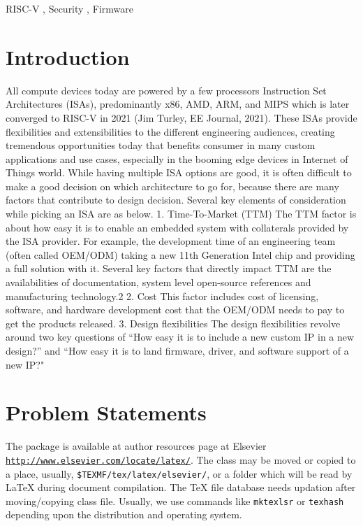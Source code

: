 \documentclass[a4paper,fleqn]{cas-dc}
\begin{document}
\begin{keywords}
RISC-V \sep 
Security \sep 
Firmware
\end{keywords}

\maketitle
\section{Introduction}
All compute devices today are powered by a few processors Instruction Set Architectures
(ISAs), predominantly x86, AMD, ARM, and MIPS which is later converged to RISC-V in
2021 (Jim Turley, EE Journal, 2021). These ISAs provide flexibilities and extensibilities to the
different engineering audiences, creating tremendous opportunities today that benefits
consumer in many custom applications and use cases, especially in the booming edge devices
in Internet of Things world.
While having multiple ISA options are good, it is often difficult to make a good decision on
which architecture to go for, because there are many factors that contribute to design decision.
Several key elements of consideration while picking an ISA are as below.
1. Time-To-Market (TTM)
The TTM factor is about how easy it is to enable an embedded system with collaterals
provided by the ISA provider. For example, the development time of an engineering team
(often called OEM/ODM) taking a new 11th Generation Intel chip and providing a full
solution with it. Several key factors that directly impact TTM are the availabilities of
documentation, system level open-source references and manufacturing technology.2
2. Cost
This factor includes cost of licensing, software, and hardware development cost that the
OEM/ODM needs to pay to get the products released.
3. Design flexibilities
The design flexibilities revolve around two key questions of “How easy it is to include a
new custom IP in a new design?” and “How easy it is to land firmware, driver, and
software support of a new IP?"


\section{ Problem Statements}
The package is available at author resources page at Elsevier
\href{http://www.elsevier.com/locate/latex/}{\nolinkurl{http://www.elsevier.com/locate/latex/}}. %
The class may be moved or copied to a place, usually,
\verb+$TEXMF/tex/latex/elsevier/+, %
or a folder which will be read by \LaTeX{} during document compilation. The \TeX{} file
database needs updation after moving/copying class file.  Usually,
we use commands like \verb+mktexlsr+ or \verb+texhash+ depending
upon the distribution and operating system. 
\end{document}
